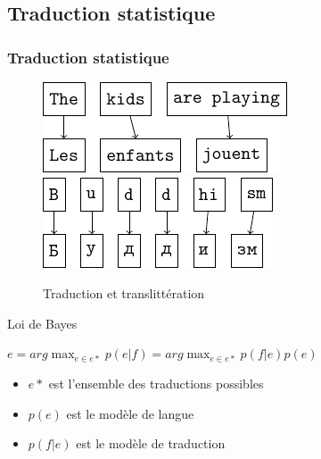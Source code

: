 \documentclass{beamer}
\begin{document}
\subsection{Traduction statistique}
\begin{frame}
\tableofcontents[currentsection]
\end{frame}
\begin{frame}
    \frametitle{Traduction statistique}
    \begin{figure}[H]
        \label{translation_alignment}
        \caption{Traduction et translittération}
        \centering
        \vspace{0.3cm}
        \includegraphics{word_alignment.pdf}
        \hspace{0.5cm}
        \includegraphics{letter_alignment.pdf}
    \end{figure}
    \begin{block}{Loi de Bayes}
    \begin{center}
    $\displaystyle e = arg \max_{e \in e*} p(e|f) = arg \max_{e \in e*} p(f|e)p(e)$

    \begin{itemize}
        \item $e*$ est l'ensemble des traductions possibles
        \item $p(e)$ est le modèle de langue
        \item $p(f|e)$ est le modèle de traduction
    \end{itemize}
    \end{center}
    \end{block}
\end{frame}
\end{document}
